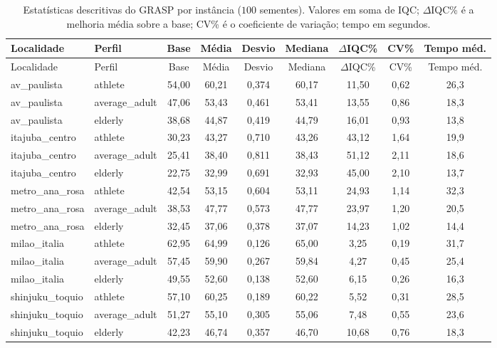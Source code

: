 \documentclass[11pt,a4paper]{article}
\begin{document}
\begin{longtable}{@{}l l c c c c c c c@{}}
\caption{Estatísticas descritivas do GRASP por instância ($100$ sementes). Valores em soma de IQC; $\Delta$IQC\% é a melhoria média sobre a base; CV\% é o coeficiente de variação; tempo em segundos.}\label{tab:grasp-desc}\\
\toprule
Localidade & Perfil & Base & Média & Desvio & Mediana & $\Delta$IQC\% & CV\% & Tempo méd. \\
\midrule
\endfirsthead
\toprule
Localidade & Perfil & Base & Média & Desvio & Mediana & $\Delta$IQC\% & CV\% & Tempo méd. \\
\midrule
\endhead
av\_paulista & athlete & 54,00 & 60,21 & 0,374 & 60,17 & 11,50 & 0,62 & 26,3 \\
av\_paulista & average\_adult & 47,06 & 53,43 & 0,461 & 53,41 & 13,55 & 0,86 & 18,3 \\
av\_paulista & elderly & 38,68 & 44,87 & 0,419 & 44,79 & 16,01 & 0,93 & 13,8 \\
itajuba\_centro & athlete & 30,23 & 43,27 & 0,710 & 43,26 & 43,12 & 1,64 & 19,9 \\
itajuba\_centro & average\_adult & 25,41 & 38,40 & 0,811 & 38,43 & 51,12 & 2,11 & 18,6 \\
itajuba\_centro & elderly & 22,75 & 32,99 & 0,691 & 32,93 & 45,00 & 2,10 & 13,7 \\
metro\_ana\_rosa & athlete & 42,54 & 53,15 & 0,604 & 53,11 & 24,93 & 1,14 & 32,3 \\
metro\_ana\_rosa & average\_adult & 38,53 & 47,77 & 0,573 & 47,77 & 23,97 & 1,20 & 20,5 \\
metro\_ana\_rosa & elderly & 32,45 & 37,06 & 0,378 & 37,07 & 14,23 & 1,02 & 14,4 \\
milao\_italia & athlete & 62,95 & 64,99 & 0,126 & 65,00 & 3,25 & 0,19 & 31,7 \\
milao\_italia & average\_adult & 57,45 & 59,90 & 0,267 & 59,84 & 4,27 & 0,45 & 25,4 \\
milao\_italia & elderly & 49,55 & 52,60 & 0,138 & 52,60 & 6,15 & 0,26 & 16,3 \\
shinjuku\_toquio & athlete & 57,10 & 60,25 & 0,189 & 60,22 & 5,52 & 0,31 & 28,5 \\
shinjuku\_toquio & average\_adult & 51,27 & 55,10 & 0,305 & 55,06 & 7,48 & 0,55 & 23,6 \\
shinjuku\_toquio & elderly & 42,23 & 46,74 & 0,357 & 46,70 & 10,68 & 0,76 & 18,3 \\
\bottomrule
\end{longtable}
\end{document}
